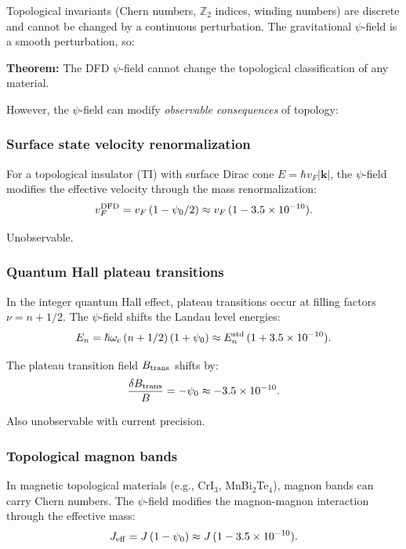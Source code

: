 \documentclass[11pt]{article}
\newcommand{\ee}[1]{\times 10^{#1}}
\begin{document}
Topological invariants (Chern numbers, $\mathbb{Z}_2$ indices, winding numbers) are discrete and cannot be changed by a continuous perturbation. The gravitational $\psi$-field is a smooth perturbation, so:

\textbf{Theorem:} The DFD $\psi$-field cannot change the topological classification of any material.

However, the $\psi$-field can modify \emph{observable consequences} of topology:

\subsubsection{Surface state velocity renormalization}

For a topological insulator (TI) with surface Dirac cone $E = \hbar v_F |\mathbf{k}|$, the $\psi$-field modifies the effective velocity through the mass renormalization:
\begin{equation}
v_F^{\rm DFD} = v_F\,(1 - \psi_0/2) \approx v_F\,(1 - 3.5\ee{-10}).
\end{equation}

Unobservable.

\subsubsection{Quantum Hall plateau transitions}

In the integer quantum Hall effect, plateau transitions occur at filling factors $\nu = n + 1/2$. The $\psi$-field shifts the Landau level energies:
\begin{equation}
E_n = \hbar\omega_c\,(n + 1/2)\,(1 + \psi_0) \approx E_n^{\rm std}\,(1 + 3.5\ee{-10}).
\end{equation}

The plateau transition field $B_{\rm trans}$ shifts by:
\begin{equation}
\frac{\delta B_{\rm trans}}{B} = -\psi_0 \approx -3.5\ee{-10}.
\end{equation}

Also unobservable with current precision.

\subsubsection{Topological magnon bands}

In magnetic topological materials (e.g., CrI$_3$, MnBi$_2$Te$_4$), magnon bands can carry Chern numbers. The $\psi$-field modifies the magnon-magnon interaction through the effective mass:
\begin{equation}
J_{\rm eff} = J\,(1 - \psi_0) \approx J\,(1 - 3.5\ee{-10}).
\end{equation}
\end{document}
